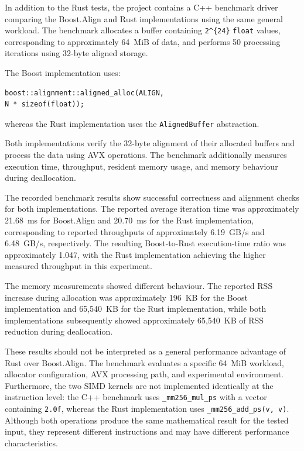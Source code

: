 In addition to the Rust tests, the project contains a C++ benchmark driver comparing the Boost.Align and Rust 
implementations using the same general workload. The benchmark allocates a buffer containing
\lstinline|2^{24}| \lstinline|float| values, corresponding to approximately 64~MiB of data, and performs 50 processing 
iterations using 32-byte aligned storage.

The Boost implementation uses:

\begin{lstlisting}[style=cppblock]
boost::alignment::aligned_alloc(ALIGN,
N * sizeof(float));
\end{lstlisting}

whereas the Rust implementation uses the \lstinline|AlignedBuffer|
abstraction.

Both implementations verify the 32-byte alignment of their allocated buffers and process the data using AVX operations. 
The benchmark additionally measures execution time, throughput, resident memory usage, and memory behaviour during 
deallocation.

The recorded benchmark results show successful correctness and alignment checks for both implementations. 
The reported average iteration time was approximately 21.68~ms for Boost.Align and 20.70~ms for the Rust implementation, 
corresponding to reported throughputs of approximately 6.19~GB/s and 6.48~GB/s, respectively.
The resulting Boost-to-Rust execution-time ratio was approximately 1.047, with the Rust implementation achieving 
the higher measured throughput in this experiment.

The memory measurements showed different behaviour. The reported RSS increase during allocation was approximately 
196~KB for the Boost implementation and 65,540~KB for the Rust implementation, while both implementations subsequently 
showed approximately 65,540~KB of RSS reduction during deallocation.

These results should not be interpreted as a general performance advantage of Rust over Boost.Align. 
The benchmark evaluates a specific 64~MiB workload, allocator configuration, AVX processing path, and
experimental environment. Furthermore, the two SIMD kernels are not implemented identically at the instruction level: 
the C++ benchmark uses \lstinline|_mm256_mul_ps| with a vector containing \lstinline|2.0f|, 
whereas the Rust implementation uses \lstinline|_mm256_add_ps(v, v)|. Although both operations produce the
same mathematical result for the tested input, they represent different instructions and may have different performance
characteristics.

